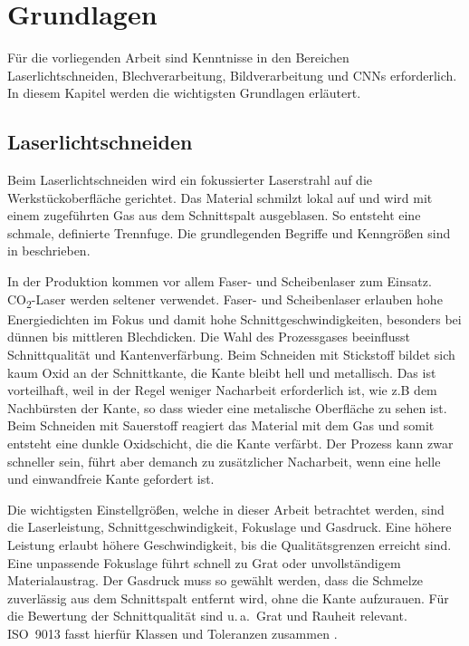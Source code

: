 \chapter{Grundlagen}

Für die vorliegenden Arbeit sind Kenntnisse in den Bereichen Laserlichtschneiden, Blechverarbeitung, Bildverarbeitung und \ac{CNNs} erforderlich. In diesem Kapitel werden die wichtigsten Grundlagen erläutert.

\section{Laserlichtschneiden}
\label{sec:laserlichtschneiden}

Beim Laserlichtschneiden wird ein fokussierter Laserstrahl auf die Werkstückoberfläche gerichtet. Das Material schmilzt lokal auf und wird mit einem zugeführten Gas aus dem Schnittspalt ausgeblasen. So entsteht eine schmale, definierte Trennfuge. Die grundlegenden Begriffe und Kenngrößen sind in \parencite{ISO11145-2018} beschrieben.

In der Produktion kommen vor allem Faser- und Scheibenlaser zum Einsatz. CO\textsubscript{2}-Laser werden seltener verwendet. Faser- und Scheibenlaser erlauben hohe Energiedichten im Fokus und damit hohe Schnittgeschwindigkeiten, besonders bei dünnen bis mittleren Blechdicken. Die Wahl des Prozessgases beeinflusst Schnittqualität und Kantenverfärbung. Beim Schneiden mit Stickstoff bildet sich kaum Oxid an der Schnittkante, die Kante bleibt hell und metallisch. Das ist vorteilhaft, weil in der Regel weniger Nacharbeit erforderlich ist, wie z.B dem Nachbürsten der Kante, so dass wieder eine metalische Oberfläche zu sehen ist. Beim Schneiden mit Sauerstoff reagiert das Material mit dem Gas und somit entsteht eine dunkle Oxidschicht, die die Kante verfärbt. Der Prozess kann zwar schneller sein, führt aber demanch zu zusätzlicher Nacharbeit, wenn eine helle und einwandfreie Kante gefordert ist.

Die wichtigsten Einstellgrößen, welche in dieser Arbeit betrachtet werden, sind die Laserleistung, Schnittgeschwindigkeit, Fokuslage und Gasdruck. Eine höhere Leistung erlaubt höhere Geschwindigkeit, bis die Qualitätsgrenzen erreicht sind. Eine unpassende Fokuslage führt schnell zu Grat oder unvollständigem Materialaustrag. Der Gasdruck muss so gewählt werden, dass die Schmelze zuverlässig aus dem Schnittspalt entfernt wird, ohne die Kante aufzurauen. Für die Bewertung der Schnittqualität sind u.\,a.\ Grat und Rauheit relevant. ISO~9013 fasst hierfür Klassen und Toleranzen zusammen \parencite{ISO9013-2017}.

